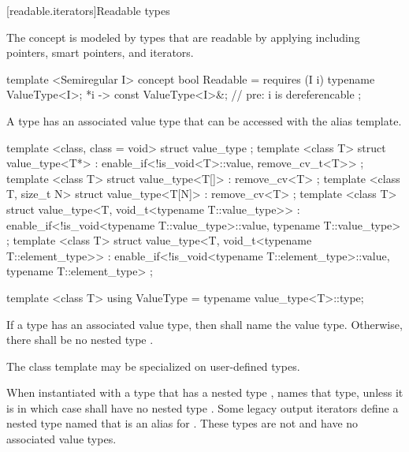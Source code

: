 \begin{addedblock}
[readable.iterators]{Readable types}

\pnum
The  concept is modeled by types that are readable by applying 
including pointers, smart pointers, and iterators.

%
\begin{codeblock}
  template <Semiregular I>
  concept bool Readable =
    requires (I i) {
      typename ValueType<I>;
      { *i } -> const ValueType<I>&; // pre: i is dereferencable
    };
\end{codeblock}

\pnum
A  type has an associated value type that can be accessed with the 
alias template.

%
\begin{codeblock}
  template <class, class = void> struct value_type { };
  template <class T>
  struct value_type<T*>
    : enable_if<!is_void<T>::value, remove_cv_t<T>> { };
  template <class T>
  struct value_type<T[]> : remove_cv<T> { };
  template <class T, size_t N>
  struct value_type<T[N]> : remove_cv<T> { };
  template <class T>
  struct value_type<T, void_t<typename T::value_type>>
    : enable_if<!is_void<typename T::value_type>::value, typename T::value_type> { };
  template <class T>
  struct value_type<T, void_t<typename T::element_type>>
    : enable_if<!is_void<typename T::element_type>::value, typename T::element_type> { };

  template <class T>
  using ValueType = typename value_type<T>::type;
\end{codeblock}

\pnum
If a type  has an associated value type, then  shall name the
value type. Otherwise, there shall be no nested type .

\pnum
The  class template may be specialized on user-defined types.

\pnum
When instantiated with a type  that has a nested type ,
 names that type, unless it is  in which case
 shall have no nested type . \enternote Some legacy output
iterators define a nested type named  that is an alias for . These
types are not  and have no associated value types.\exitnote


\end{addedblock}
